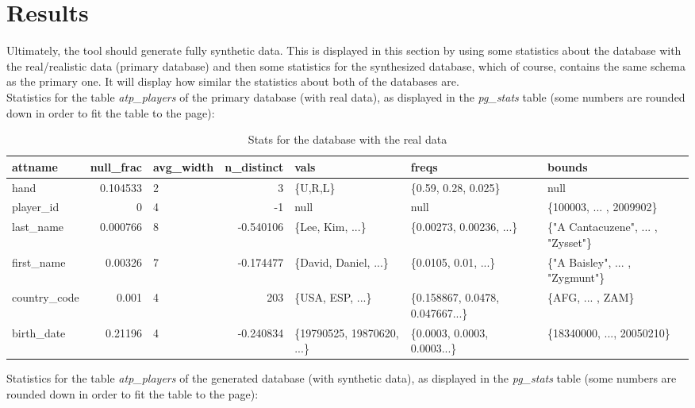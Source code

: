 \section{Results}
Ultimately, the tool should generate fully synthetic data. This is displayed in this section by using some statistics about the database with the real/realistic data (primary database) and then some statistics for the synthesized database, which of course, contains the same schema as the primary one. It will display how similar the statistics about both of the databases are.\\
\newline
Statistics for the table \textit{atp\_players} of the primary database (with real data), as displayed in the \textit{pg\_stats} table (some numbers are rounded down in order to fit the table to the page):
\begin{table}[H]
\caption{Stats for the database with the real data}
\label{tab:real_data_stats}
\centering
\begin{tabularx}{\linewidth}{|l|r|X|r|X|X|X|}
\hline
	attname & null\_frac & avg\_width & n\_distinct & vals & freqs & bounds
	\\ \hline
hand          & 0.104533    & 2 & 3         & \{U,R,L\}                     & \{0.59, 0.28, 0.025\}        & null                                \\ \hline
player\_id    & 0           & 4 & -1        & null                          & null                              & \{100003, ... , 2009902\}           \\ \hline
last\_name    & 0.000766 & 8 & -0.540106 & \{Lee, Kim, ...\}        & \{0.00273, 0.00236, ...\}     & \{"A Cantacuzene", ... , "Zysset"\} \\ \hline
first\_name   & 0.00326  & 7 & -0.174477 & \{David, Daniel, ...\} & \{0.0105, 0.01, ...\}        & \{"A Baisley", ... ,  "Zygmunt"\}      \\ \hline
country\_code & 0.001       & 4 & 203       & \{USA, ESP, ...\}     & \{0.158867, 0.0478, 0.047667...\} & \{AFG, ... , ZAM\}                  \\ \hline
birth\_date   & 0.21196    & 4 & -0.240834 & \{19790525, 19870620, ...\}      & \{0.0003, 0.0003, 0.0003...\}     & \{18340000, ..., 20050210\}         \\ \hline
\end{tabularx}
\end{table}
\newpage
Statistics for the table \textit{atp\_players} of the generated database (with synthetic data), as displayed in the \textit{pg\_stats} table (some numbers are rounded down in order to fit the table to the page):

